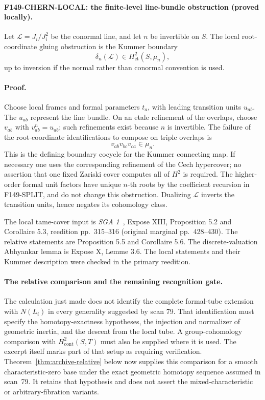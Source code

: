 \documentclass[11pt,a4paper]{article}
\theoremstyle{definition}
\begin{document}
\paragraph{F149-CHERN-LOCAL: the finite-level line-bundle obstruction
(proved locally).}
Let \(\mathcal L=J_i/J_i^2\) be the conormal line, and let \(n\) be
invertible on \(S\).  The local root-coordinate gluing obstruction is
the Kummer boundary
\[
 \delta_n(\mathcal L)\in H^2_{\mathrm{et}}(S,\mu_n),
\]
up to inversion if the normal rather than conormal convention is used.

\paragraph{Proof.}
Choose local frames and formal parameters \(t_a\), with leading
transition units \(u_{ab}\).  The \(u_{ab}\) represent the line bundle.
On an etale refinement of the overlaps, choose
\(v_{ab}\) with \(v_{ab}^n=u_{ab}\); such refinements exist because
\(n\) is invertible.  The failure of the root-coordinate identifications
to compose on triple overlaps is
\[
 v_{ab}v_{bc}v_{ca}\in\mu_n.
\]
This is the defining boundary cocycle for the Kummer connecting map.
If necessary one uses the corresponding refinement of the Cech
hypercover; no assertion that one fixed Zariski cover computes all of
\(H^2\) is required.  The higher-order formal unit factors have unique
\(n\)-th roots by the coefficient recursion in F149-SPLIT, and do not
change this obstruction.  Dualizing \(\mathcal L\) inverts the
transition units, hence negates its cohomology class.

The local tame-cover input is \emph{SGA 1}~\cite{SGA1}, Expose XIII,
Proposition 5.2 and Corollaire 5.3, reedition pp.~315--316
(original marginal pp.~428--430).  The relative statements are
Proposition 5.5 and Corollaire 5.6.  The discrete-valuation
Abhyankar lemma is Expose X, Lemme 3.6.  The local statements and
their Kummer description were checked in the primary reedition.

\paragraph{The relative comparison and the remaining recognition gate.}
The calculation just made does not identify the complete formal-tube
extension with \(N(L_i)\) in every generality suggested by scan 79.
That identification must specify the homotopy-exactness hypotheses,
the injection and normalizer of geometric inertia, and the descent
from the local tube.  A group-cohomology comparison with
\(H^2_{\mathrm{cont}}(S,T)\) must also be supplied where it is used.
The excerpt itself marks part of that setup as requiring verification.
Theorem~\ref{thm:archive-relative} below now supplies this comparison for a smooth characteristic-zero base under the exact geometric homotopy sequence assumed in scan~79. It retains that hypothesis and does not assert the mixed-characteristic or arbitrary-fibration variants.
\end{document}
